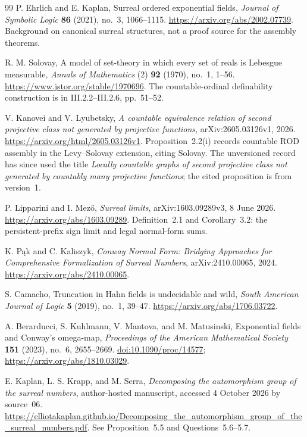 \documentclass[11pt,a4paper]{article}
\numberwithin{equation}{section}
\theoremstyle{definition}
\theoremstyle{remark}
\newcommand{\ROD}{\mathrm{ROD}}
\begin{document}
\begin{thebibliography}{99}
P. Ehrlich and E. Kaplan, Surreal ordered exponential fields,
\emph{Journal of Symbolic Logic} \textbf{86} (2021), no.~3, 1066--1115.
\url{https://arxiv.org/abs/2002.07739}. Background on canonical surreal
structures, not a proof source for the assembly theorems.

R. M. Solovay, A model of set-theory in which every set of reals is Lebesgue
measurable, \emph{Annals of Mathematics} (2) \textbf{92} (1970), no.~1,
1--56. \url{https://www.jstor.org/stable/1970696}. The countable-ordinal
definability construction is in III.2.2--III.2.6, pp.~51--52.

V. Kanovei and V. Lyubetsky, \emph{A countable equivalence relation of second
projective class not generated by projective functions}, arXiv:2605.03126v1,
2026. \url{https://arxiv.org/html/2605.03126v1}. Proposition~2.2(i) records
countable $\ROD$ assembly in the Levy--Solovay extension, citing Solovay. The
unversioned record has since used the title \emph{Locally countable graphs of
second projective class not generated by countably many projective
functions}; the cited proposition is from version~1.

P. Lipparini and I. Mez\H{o}, \emph{Surreal limits}, arXiv:1603.09289v3,
8 June 2026. \url{https://arxiv.org/abs/1603.09289}. Definition~2.1 and
Corollary~3.2: the persistent-prefix sign limit and legal normal-form sums.

K. P\k{a}k and C. Kaliszyk, \emph{Conway Normal Form: Bridging Approaches for
Comprehensive Formalization of Surreal Numbers}, arXiv:2410.00065, 2024.
\url{https://arxiv.org/abs/2410.00065}.

S. Camacho, Truncation in Hahn fields is undecidable and wild,
\emph{South American Journal of Logic} \textbf{5} (2019), no.~1, 39--47.
\url{https://arxiv.org/abs/1706.03722}.

A. Berarducci, S. Kuhlmann, V. Mantova, and M. Matusinski,
Exponential fields and Conway's omega-map,
\emph{Proceedings of the American Mathematical Society} \textbf{151} (2023),
no.~6, 2655--2669.
\href{https://doi.org/10.1090/proc/14577}{doi:10.1090/proc/14577};
\url{https://arxiv.org/abs/1810.03029}.

E. Kaplan, L. S. Krapp, and M. Serra, \emph{Decomposing the automorphism group
of the surreal numbers}, author-hosted manuscript, accessed 4 October 2026 by
source~06.
\url{https://elliotakaplan.github.io/Decomposing_the_automorphism_group_of_the_surreal_numbers.pdf}.
See Proposition~5.5 and Questions~5.6--5.7.


\end{thebibliography}
\end{document}
